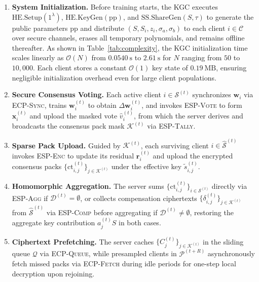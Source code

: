 \begin{enumerate}[leftmargin=*,align=left,label=\textbf{Phase \arabic*:},start=0]
 \item \textbf{System Initialization.} Before training starts, the KGC executes $\mathrm{HE.Setup}(1^\lambda)$, $\mathrm{HE.KeyGen}(\mathrm{pp})$, and $\mathrm{SS.ShareGen}(S, \tau)$ to generate the public parameters $\mathrm{pp}$ and distribute $(S, S_i, z_i, \sigma_a, \sigma_b)$ to each client $i \in \mathcal{C}$ over secure channels, erases all temporary polynomials, and remains offline thereafter. As shown in Table~\ref{tab:complexity}, the KGC initialization time scales linearly as $\mathcal{O}(N)$ from $0.0540~\mathrm{s}$ to $2.61~\mathrm{s}$ for $N$ ranging from $50$ to $10{,}000$. Each client stores a constant $\mathcal{O}(1)$ key state of $0.19~\mathrm{MB}$, ensuring negligible initialization overhead even for large client populations.

 
 \item \textbf{Secure Consensus Voting.} Each active client $i \in \mathcal{S}^{(t)}$ synchronizes $\mathbf{w}_i$ via \textsc{ECP-Sync}, trains $\mathbf{w}_i^{(t)}$ to obtain $\Delta\mathbf{w}_i^{(t)}$, and invokes \textsc{ESP-Vote} to form $\mathbf{x}_i^{(t)}$ and upload the masked vote $\hat{v}_i^{(t)}$, from which the server derives and broadcasts the consensus pack mask $\mathcal{K}^{(t)}$ via \textsc{ESP-Tally}.
 
 \item \textbf{Sparse Pack Upload.} Guided by $\mathcal{K}^{(t)}$, each surviving client $i \in \widehat{\mathcal{S}}^{(t)}$ invokes \textsc{ESP-Enc} to update its residual $\mathbf{r}_i^{(t)}$ and upload the encrypted consensus packs $\{\mathrm{ct}_{i,j}^{(t)}\}_{j \in \mathcal{K}^{(t)}}$ under the effective key $\tilde{s}_{i,j}^{(t)}$.
 
 \item \textbf{Homomorphic Aggregation.} The server sums $\{\mathrm{ct}_{i,j}^{(t)}\}_{i \in \mathcal{S}^{(t)}}$ directly via \textsc{ESP-Agg} if $\mathcal{D}^{(t)} = \emptyset$, or collects compensation ciphertexts $\{\delta_{i,j}^{(t)}\}_{j \in \mathcal{K}^{(t)}}$ from $\widehat{\mathcal{S}}^{(t)}$ via \textsc{ESP-Comp} before aggregating if $\mathcal{D}^{(t)} \neq \emptyset$, restoring the aggregate key contribution $a_j^{(t)}S$ in both cases.
 
 \item \textbf{Ciphertext Prefetching.} The server caches $\{C_j^{(t)}\}_{j \in \mathcal{K}^{(t)}}$ in the sliding queue $\mathcal{Q}$ via \textsc{ECP-Queue}, while presampled clients in $\mathcal{P}^{(t+R)}$ asynchronously fetch missed packs via \textsc{ECP-Fetch} during idle periods for one-step local decryption upon rejoining.
\end{enumerate}

